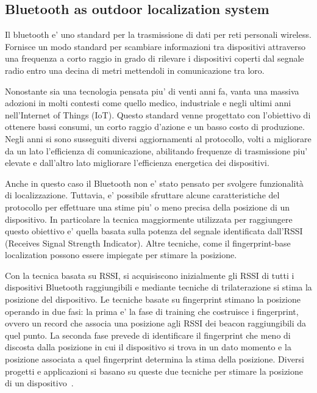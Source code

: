 


\subsection{Bluetooth as outdoor localization system}
Il bluetooth e' uno standard per la trasmissione di dati per reti personali wireless. Fornisce un modo standard per scambiare informazioni tra
dispositivi attraverso una frequenza a corto raggio in grado di rilevare i dispositivi coperti dal segnale radio entro una decina di metri mettendoli
in comunicazione tra loro.

Nonostante sia una tecnologia pensata piu' di venti anni fa, vanta una massiva adozioni in molti contesti come quello medico, industriale e negli
ultimi anni nell'Internet of Things (IoT). Questo standard venne progettato con l'obiettivo di ottenere bassi consumi, un corto raggio d'azione
e un basso costo di produzione. Negli anni si sono susseguiti diversi aggiornamenti al protocollo, volti a migliorare da un lato l'efficienza di
comunicazione, abilitando frequenze di trasmissione piu' elevate e dall'altro lato migliorare l'efficienza energetica dei dispositivi.

Anche in questo caso il Bluetooth non e' stato pensato per svolgere funzionalità di localizzazione. Tuttavia, e' possibile sfruttare alcune
caratteristiche del protocollo per effettuare una stime piu' o meno precisa della posizione di un dispositivo. In particolare la tecnica maggiormente
utilizzata per raggiungere questo obiettivo e' quella basata sulla potenza del segnale identificata dall'RSSI (Receives Signal Strength Indicator).
Altre tecniche, come il fingerprint-base localization possono essere impiegate per stimare la posizione.

Con la tecnica basata su RSSI, si acquisiscono inizialmente gli RSSI di tutti i dispositivi Bluetooth raggiungibili e mediante tecniche di
trilaterazione si stima la posizione del dispositivo. Le tecniche basate su fingerprint stimano la posizione operando in due fasi: la prima e' la fase
di training che costruisce i fingerprint, ovvero un record che associa una posizione agli RSSI dei beacon raggiungibili da quel punto. La seconda fase
prevede di identificare il fingerprint che meno di discosta dalla posizione in cui il dispositivo si trova in un dato momento e la posizione associata
a quel fingerprint determina la stima della posizione. Diversi progetti e applicazioni si basano su queste due tecniche per stimare la posizione di un
dispositivo~\cite{mcconville2021vesta, samuel2021smart}.

